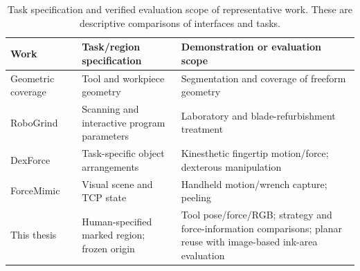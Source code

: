 \begin{table}[tbp]
\centering\footnotesize
\caption[Task specification and evaluation scope]{Task specification and verified evaluation scope of representative work. These are descriptive comparisons of interfaces and tasks.}
\label{tab:related_task_scope}
\begin{tabularx}{\textwidth}{P{0.22\textwidth}XX}
\toprule Work & Task/region specification & Demonstration or evaluation scope \\ \midrule
Geometric coverage~\cite{schneyer2023segmentation} & Tool and workpiece geometry & Segmentation and coverage of freeform geometry \\
RoboGrind~\cite{alt2024robogrind} & Scanning and interactive program parameters & Laboratory and blade-refurbishment treatment \\
DexForce~\cite{chen2025dexforce} & Task-specific object arrangements & Kinesthetic fingertip motion/force; dexterous manipulation \\
ForceMimic~\cite{liu2025forcemimic} & Visual scene and TCP state & Handheld motion/wrench capture; peeling \\
This thesis & Human-specified marked region; frozen origin & Tool pose/force/RGB; strategy and force-information comparisons; planar reuse with image-based ink-area evaluation \\
\bottomrule
\end{tabularx}
\end{table}
